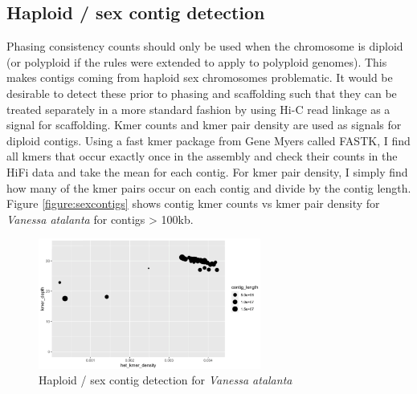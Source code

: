 {\subsection{Haploid / sex contig detection}

\par{
Phasing consistency counts should only be used when the chromosome is diploid (or polyploid if the rules were extended to apply to polyploid genomes). This makes contigs coming from haploid sex chromosomes problematic. It would be desirable to detect these prior to phasing and scaffolding such that they can be treated separately in a more standard fashion by using Hi-C read linkage as a signal for scaffolding. Kmer counts and kmer pair density are used as signals for diploid contigs. Using a fast kmer package from Gene Myers called FASTK\cite{fastk}, I find all kmers that occur exactly once in the assembly and check their counts in the HiFi data and take the mean for each contig. For kmer pair density, I simply find how many of the kmer pairs occur on each contig and divide by the contig length. Figure \ref{figure:sexcontigs} shows contig kmer counts vs kmer pair density for \textit{Vanessa atalanta} for contigs > 100kb.
}

\begin{figure}[htbp!]
\caption{Haploid / sex contig detection for \textit{Vanessa atalanta}}
\label{figure:sexcontig}
\begin{centering}
\includegraphics[width=0.65\textwidth]{sexcontig.png}
\end{centering}
\end{figure}

}

